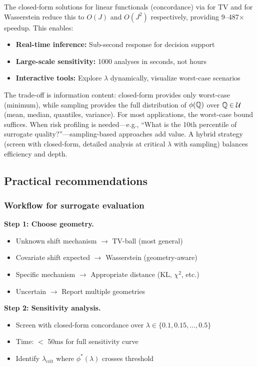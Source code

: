 \documentclass{article}
\begin{document}
The closed-form solutions for linear functionals (concordance) via \cite{bentalnemirovski2013} for TV and \cite{esfahanikuhn2018} for Wasserstein reduce this to $O(J)$ and $O(J^2)$ respectively, providing 9--487$\times$ speedup. This enables:

\begin{itemize}
    \item \textbf{Real-time inference:} Sub-second response for decision support
    \item \textbf{Large-scale sensitivity:} 1000 analyses in seconds, not hours
    \item \textbf{Interactive tools:} Explore $\lambda$ dynamically, visualize worst-case scenarios
\end{itemize}

The trade-off is information content: closed-form provides only worst-case (minimum), while sampling provides the full distribution of $\phi(\mathbb{Q})$ over $\mathbb{Q} \in \mathcal{U}$ (mean, median, quantiles, variance). For most applications, the worst-case bound suffices. When risk profiling is needed---e.g., ``What is the 10th percentile of surrogate quality?''---sampling-based approaches add value. A hybrid strategy (screen with closed-form, detailed analysis at critical $\lambda$ with sampling) balances efficiency and depth.

\subsection{Practical recommendations}

\subsubsection{Workflow for surrogate evaluation}

\textbf{Step 1: Choose geometry.}
\begin{itemize}
    \item Unknown shift mechanism $\rightarrow$ TV-ball (most general)
    \item Covariate shift expected $\rightarrow$ Wasserstein (geometry-aware)
    \item Specific mechanism $\rightarrow$ Appropriate distance (KL, $\chi^2$, etc.)
    \item Uncertain $\rightarrow$ Report multiple geometries
\end{itemize}

\textbf{Step 2: Sensitivity analysis.}
\begin{itemize}
    \item Screen with closed-form concordance over $\lambda \in \{0.1, 0.15, \ldots, 0.5\}$
    \item Time: $<$ 50ms for full sensitivity curve
    \item Identify $\lambda_{\text{crit}}$ where $\phi^*(\lambda)$ crosses threshold
\end{itemize}
\end{document}

